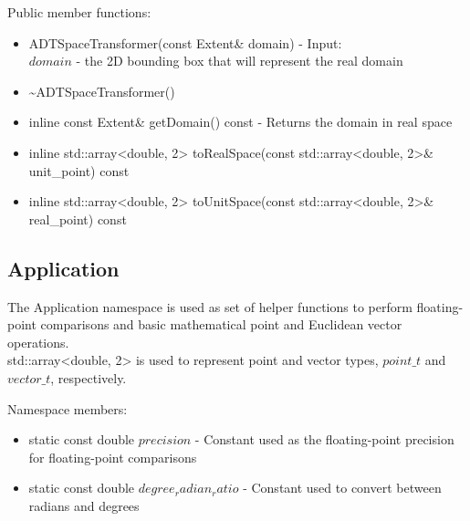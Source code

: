 \documentclass[manuscript, screen]{acmart}
\begin{document}
Public member functions:
\begin{itemize}
\item ADTSpaceTransformer(const Extent\& domain) - Input:\\
$domain$ - the 2D bounding box that will represent the real domain

\item \textasciitilde{}ADTSpaceTransformer()
%

\item inline const Extent\& getDomain() const - Returns the domain in real space

\item inline std::array<double, 2> toRealSpace(const std::array<double, 2>\& unit\_point) const

\item inline std::array<double, 2> toUnitSpace(const std::array<double, 2>\& real\_point) const
\end{itemize}

\subsection{Application}

The Application namespace is used as set of helper functions to perform floating-point comparisons and basic mathematical point and Euclidean vector operations.\\
std::array<double, 2> is used to represent point and vector types, $point\_t$ and $vector\_t$, respectively.
 
Namespace members:
\begin{itemize}
\item static const double $precision$ - Constant used as the floating-point precision for floating-point comparisons
\item static const double $degree_radian_ratio$ - Constant used to convert between radians and degrees
\end{itemize}
\end{document}
